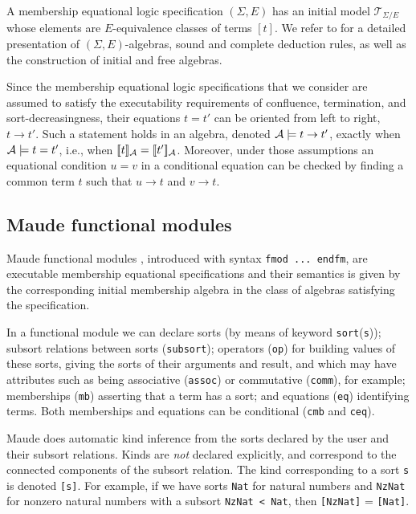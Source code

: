 A membership equational logic specification $(\Sigma,E)$ has an initial model 
$\mathcal{T}_{\Sigma/E}$ whose elements
are $E$-equivalence classes of terms $[t]$.
We refer to \cite{BouhoulaJouannaudMeseguer00,Meseguer97} for a detailed presentation of
$(\Sigma,E)$-algebras,
sound and complete deduction rules, as well as the construction of
initial and free algebras.

Since the membership equational logic specifications that we consider are assumed
to satisfy the executability requirements of confluence, termination, and 
sort-decreasingness, their equations $t=t'$ can be oriented from left to right,
$t \rightarrow t'$. Such a statement holds in an algebra, denoted 
$\mathcal{A} \models t \rightarrow t'$, exactly when $\mathcal{A} \models t = t'$, i.e., when
$[\![t]\!]_{\mathcal{A}} = [\![t']\!]_{\mathcal{A}}$. Moreover, under those assumptions an equational condition $u = v$
in a conditional equation can be checked by finding a common term $t$ such
that $u \rightarrow t$ and $v \rightarrow t$.

\subsection{Maude functional modules} \label{maudefmod}

Maude functional modules \cite[Chapter 4]{maude-book}, introduced 
with syntax \texttt{fmod ...\ endfm}, are executable membership
equational specifications and their semantics is given by the corresponding
initial membership algebra in the class of algebras satisfying the specification.

In a functional module we can declare sorts (by means of keyword
\texttt{sort}(\texttt{s})); subsort relations between sorts
(\texttt{subsort}); operators (\texttt{op}) for building values of these
sorts, giving the sorts of their arguments and result, and which may have
attributes such as being associative (\texttt{assoc}) or commutative
(\texttt{comm}), for example; memberships (\texttt{mb}) asserting that a term
has a sort; and equations (\texttt{eq}) identifying terms.  
Both memberships and equations can be conditional (\texttt{cmb} and \texttt{ceq}).

Maude does automatic kind inference from the sorts declared by the user and
their subsort relations.  Kinds are \emph{not} declared explicitly, and
correspond to the connected components of the subsort relation.
The kind corresponding to a sort \texttt{s} is denoted \texttt{[s]}.
For example, if we have sorts \texttt{Nat} for natural numbers and \texttt{NzNat} 
for nonzero natural numbers with a subsort \texttt{NzNat < Nat}, then 
\texttt{[NzNat]} = \texttt{[Nat]}.

